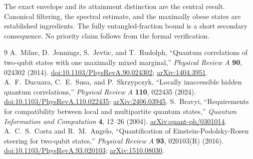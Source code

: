 \documentclass[11pt]{article}
\begin{document}
The exact envelope and its attainment distinction are the central result. Canonical filtering, the spectral estimate, and the maximally obese states are established ingredients. The fully entangled-fraction bound is a short secondary consequence. No priority claim follows from the formal verification.

\begin{thebibliography}{9}
 A.~Milne, D.~Jennings, S.~Jevtic, and T.~Rudolph,
``Quantum correlations of two-qubit states with one maximally mixed marginal,''
\emph{Physical Review A} \textbf{90}, 024302 (2014).
\href{https://doi.org/10.1103/PhysRevA.90.024302}{doi:10.1103/PhysRevA.90.024302};
\href{https://arxiv.org/abs/1404.3951}{arXiv:1404.3951}.
 A.~F.~Ducuara, C.~E.~Susa, and P.~Skrzypczyk,
``Locally inaccessible hidden quantum correlations,''
\emph{Physical Review A} \textbf{110}, 022435 (2024).
\href{https://doi.org/10.1103/PhysRevA.110.022435}{doi:10.1103/PhysRevA.110.022435};
\href{https://arxiv.org/abs/2406.03945}{arXiv:2406.03945}.
 S.~Bravyi, ``Requirements for compatibility between local and multipartite quantum states,''
\emph{Quantum Information and Computation} \textbf{4}, 12--26 (2004).
\href{https://arxiv.org/abs/quant-ph/0301014}{arXiv:quant-ph/0301014}.
 A.~C.~S.~Costa and R.~M.~Angelo,
``Quantification of Einstein-Podolsky-Rosen steering for two-qubit states,''
\emph{Physical Review A} \textbf{93}, 020103(R) (2016).
\href{https://doi.org/10.1103/PhysRevA.93.020103}{doi:10.1103/PhysRevA.93.020103};
\href{https://arxiv.org/abs/1510.08030}{arXiv:1510.08030}.
\end{thebibliography}
\end{document}

